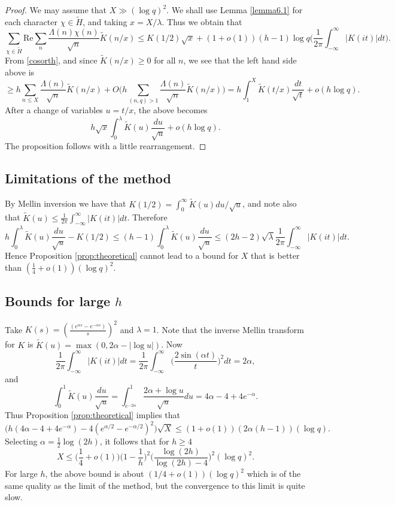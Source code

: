 \documentclass [12pt]{amsart}
\numberwithin{equation}{section}
\begin{document}
\begin{proof}  We may assume that $X\gg (\log q)^2$.  We shall use Lemma \ref{lemma6.1} for each character $\chi \in {\tilde H}$, 
and taking $x=X/\lambda$.   Thus we obtain that 
$$ 
\sum_{\chi \in{\tilde H}} \text{Re} \sum_{n}\frac{ \Lambda(n)\chi(n)}{\sqrt{n}} {\tilde K}(n/x) 
\le K(1/2)\sqrt{x} +  (1+o(1))(h-1) \log q \Big(\frac{1}{2\pi} \int_{-\infty}^{\infty} |K(it)|dt\Big).
$$
From \eqref{cosorth}, and since ${\tilde K}(n/x)\ge 0$ for all $n$, we see that the left hand side above is 
$$ 
\ge h \sum_{n\le X} \frac{\Lambda(n)}{\sqrt{n}} {\tilde K}(n/x) +O\Big(h\sum_{(n,q)>1} \frac{\Lambda(n)}{\sqrt{n}} {\tilde K}(n/x)\Big) 
= h \int_{1}^{X}{\tilde K}(t/x) \frac{dt}{\sqrt{t}} + o(h\log q). 
$$ 
After a change of variables $u=t/x$, the 
above becomes 
$$ 
h\sqrt{x} \int_0^{\lambda} {\tilde K}(u)\frac{du}{\sqrt{u}} + o(h\log q). 
$$ 
The proposition follows with a little rearrangement.  
 \end{proof}

\subsection{Limitations of the method}  
 
By Mellin inversion we have that 
$K(1/2) = \int_0^{\infty} {\tilde K}(u) du/\sqrt{u}$, and note also that 
${\tilde K}(u) \le \frac{1}{2\pi} \int_{-\infty}^{\infty} |K(it)|dt$.  Therefore 
$$ 
h\int_0^{\lambda} {\tilde K}(u)\frac{du}{\sqrt{u}} - 
{K(1/2)}\le (h-1) \int_0^{\lambda} {\tilde K}(u)\frac{du}{\sqrt{u}} 
\le (2h-2) \sqrt{\lambda} \frac{1}{2\pi} \int_{-\infty}^{\infty} |K(it)| dt.  
$$ 
Hence Proposition \ref{prop:theoretical} cannot lead to a 
bound for $X$ that is better than $(\frac{1}4+o(1))(\log q)^2$.

\subsection{Bounds for  large $h$}  Take $K(s) =(\frac{ (e^{\alpha s}-e^{-\alpha s})}{s})^2$ and $\lambda=1$.  
Note that the inverse Mellin transform for $K$ is  ${\tilde K}(u) = \max(0, 2\alpha -|\log u|)$.     
Now 
$$ 
\frac{1}{2\pi} \int_{-\infty}^{\infty} |K(it)|dt = \frac{1}{2\pi} \int_{-\infty}^{\infty} \Big(\frac{2\sin(\alpha t)}{t}\Big)^2 dt =  2\alpha,
$$ 
and 
$$ 
\int_0^1 {\tilde K}(u) \frac{du}{\sqrt{u}} = \int_{e^{-2\alpha}}^1 \frac{2\alpha+\log u}{\sqrt{u}} du 
= 4\alpha-4+4e^{-\alpha}. 
$$ 
Thus Proposition \ref{prop:theoretical} implies that 
$$ 
\Big( h(4\alpha-4+4e^{-\alpha}) - 4(e^{\alpha/2}-e^{-\alpha/2})^2\Big) 
\sqrt{X} \le (1+o(1)) (2\alpha (h-1)) (\log q). 
$$ 
Selecting $\alpha = \frac 12 \log (2h)$, it follows that for $h\ge 4$ 
$$ 
X\le \Big(\frac 14+o(1)\Big)  \Big(1-\frac 1h\Big)^2 \Big(\frac{\log (2h)}{\log (2h)-4}\Big)^2(\log q)^2.
$$
For large $h$, the above bound is about $(1/4+o(1)) (\log q)^2$ which is 
of the same quality as the limit of the method, but the convergence to this limit is 
quite slow.  
\end{document}
